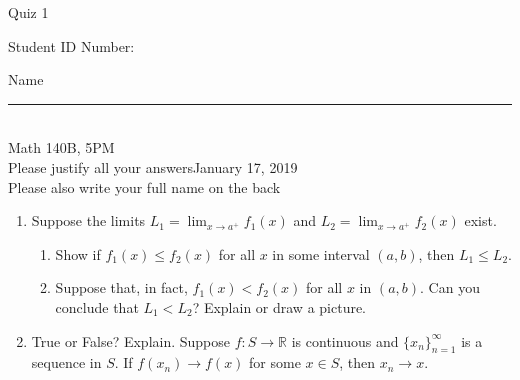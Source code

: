 \documentclass[12pt]{article}
\begin{document}
\begin{flushleft} 
\centerline{\LARGE{Quiz 1}} 
\vspace{5 mm}
{Student ID Number:}\hfill  
{Name \rule {2 in}{0.01in}}\\
Math 140B, 5PM
\\
{Please justify all your answers}\hfill {January 17, 2019}
\\
{Please also write your full name on the back} 

\medskip
\end{flushleft}

\begin{enumerate}
	\item Suppose the limits $L_1 = \lim_{x\to a^+}f_1(x)$ and $L_2 = \lim_{x\to a^+}f_2(x)$ exist.
	\begin{enumerate}
		\item Show if $f_1(x)\leq f_2(x)$ for all $x$ in some interval $(a,b)$, then $L_1\leq L_2$.
		\vfill
		\item Suppose that, in fact, $f_1(x)<f_2(x)$ for all $x$ in $(a,b)$. Can you conclude that $L_1<L_2$? Explain or draw a picture.
	\end{enumerate}
	\vfill

	\item True or False? Explain.
	Suppose $f: S\to \mathbb{R}$ is continuous and $\{x_n\}_{n=1}^\infty$ is a sequence in $S$. If $f(x_n)\to f(x)$ for some $x\in S$, then $x_n\to x$.
	\vfill
\end{enumerate}

\end{document}

